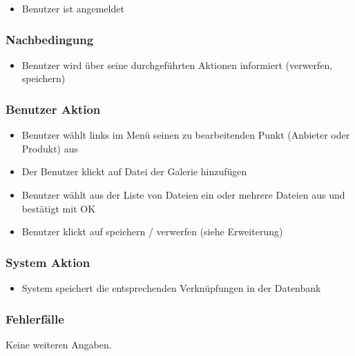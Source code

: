 \documentclass[a4paper,12pt]{article}
\begin{document}
\begin{itemize}

\item
  Benutzer ist angemeldet
\end{itemize}

\subsubsection{Nachbedingung}\label{nachbedingung-5}

\begin{itemize}

\item
  Benutzer wird über seine durchgeführten Aktionen informiert
  (verwerfen, speichern)
\end{itemize}

\subsubsection{Benutzer Aktion}\label{benutzer-aktion-5}

\begin{itemize}

\item
  Benutzer wählt links im Menü seinen zu bearbeitenden Punkt (Anbieter
  oder Produkt) aus
\item
  Der Benutzer klickt auf Datei der Galerie hinzufügen
\item
  Benutzer wählt aus der Liste von Dateien ein oder mehrere Dateien aus
  und bestätigt mit OK
\item
  Benutzer klickt auf speichern / verwerfen (siehe Erweiterung)
\end{itemize}

\subsubsection{System Aktion}\label{system-aktion-5}

\begin{itemize}

\item
  System speichert die entsprechenden Verknüpfungen in der Datenbank
\end{itemize}

\subsubsection{Fehlerfälle}\label{fehlerfalle-5}
Keine weiteren Angaben.
\end{document}
